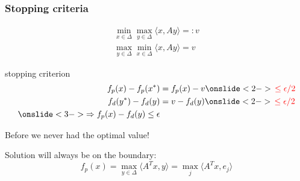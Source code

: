 \documentclass{beamer}
\begin{document}
\begin{frame}
  \frametitle{Stopping criteria}
  \begin{equation}
    \begin{aligned}
      \min_{x \in \Delta} \max_{y \in \Delta} \langle x, Ay \rangle =: v \\
      \max_{y \in \Delta} \min_{x \in \Delta} \langle x, Ay \rangle = v
    \end{aligned}
  \end{equation}
  \begin{block}{stopping criterion}
    \begin{equation}
      \begin{aligned}
        f_p(x) - f_p(x^*) &= f_p(x) - v \onslide<2->{\textcolor{red}{\, \le \epsilon/2}}\\
        f_d(y^*) - f_d(y) &= v - f_d(y) \onslide<2->{\textcolor{red}{\, \le \epsilon/2}} \\
        \onslide<3->{\Rightarrow f_p(x) - f_d(y) \le \epsilon}
      \end{aligned}
    \end{equation}
  \end{block}
  \begin{center}
    Before we never had the optimal value!
  \end{center}
  Solution will always be on the boundary:
  \begin{equation}
    f_p(x) = \max_{y \in \Delta} \langle A^T x, y \rangle = \max_{j} \langle A^T x, e_j \rangle
  \end{equation}
\end{frame}
\end{document}
